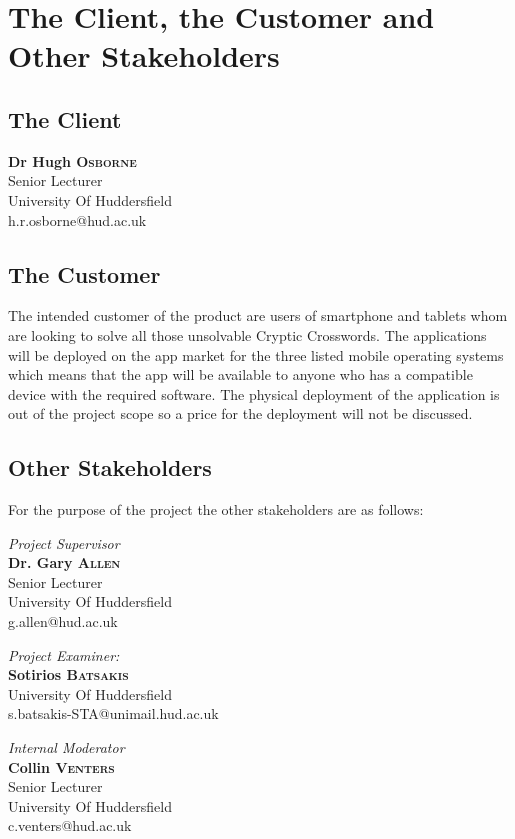 \section{The Client, the Customer and Other Stakeholders}

\subsection{The Client}

	\textbf{Dr Hugh \textsc{Osborne}}\\
	Senior Lecturer\\
	University Of Huddersfield\\
	h.r.osborne@hud.ac.uk

\subsection{The Customer}

The intended customer of the product are users of smartphone and tablets whom are looking to solve all those unsolvable Cryptic Crosswords. The applications will be deployed on the app market for the three listed mobile operating systems which means that the app will be available to anyone who has a compatible device with the required software. The physical deployment of the application is out of the project scope so a price for the deployment will not be discussed.

\subsection{Other Stakeholders}

For the purpose of the project the other stakeholders are as follows:

      \emph{Project Supervisor}\\
      \textbf{Dr. Gary \textsc{Allen}} \\
      Senior Lecturer \\
      University Of Huddersfield \\
      g.allen@hud.ac.uk 

      \emph{Project Examiner:} \\ 
      \textbf{Sotirios \textsc{Batsakis}}\\
      University Of Huddersfield\\
      s.batsakis-STA@unimail.hud.ac.uk

      \emph{Internal Moderator}\\
      \textbf{Collin \textsc{Venters}} \\
      Senior Lecturer \\
      University Of Huddersfield \\
      c.venters@hud.ac.uk

